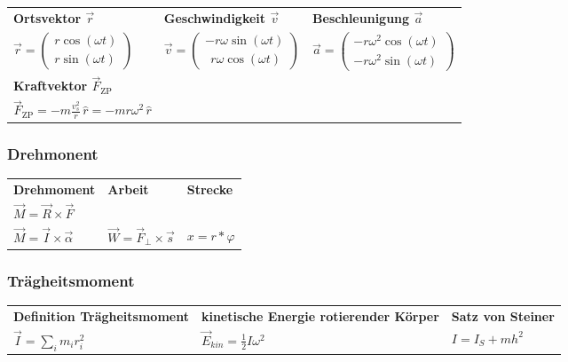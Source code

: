\documentclass[10pt,a4paper]{article}
\begin{document}
\begin{tabular}{p{} p{} p{}}
            \textbf{Ortsvektor \(\vec r\)} &
            \textbf{Geschwindigkeit \(\vec v\)}&
			\textbf{Beschleunigung \(\vec a\)} 
			\\[4pt]
			$\displaystyle
            \vec r =
            \begin{pmatrix}
                r\cos(\omega t) \\
                r\sin(\omega t)
            \end{pmatrix}$ &
            $\displaystyle
            \vec v =
            \begin{pmatrix}
                -r\omega\sin(\omega t) \\
                \;\,r\omega\cos(\omega t)
            \end{pmatrix}$ &
			$\displaystyle
			\vec a =
			\begin{pmatrix}
				-r\omega^2\cos(\omega t) \\
				-r\omega^2\sin(\omega t)
			\end{pmatrix}$
			\\[10pt]
            
            \textbf{Kraftvektor \(\vec F_{\text{ZP}}\)}
            \\[4pt]
			
            $\displaystyle
            \vec F_{\text{ZP}} = -m\frac{v_s^2}{r}\,\hat r = -m r\omega^2\,\hat r$
            \\[10pt]
		\end{tabular}
		
		\subsubsection{Drehmonent}
		\begin{tabular}{p{} p{} p{}}
			
		\textbf{Drehmoment} &
		\textbf{Arbeit} &
		\textbf{Strecke}
		\\[4pt]
		
		$\vec M = \vec R \times \vec F$ \\
		$\vec M = \vec I \times \vec \alpha$ &
		$\vec W = \vec F_{\perp} \times \vec s$ &
		$x = r*\varphi$
		\\[10pt]
		\end{tabular}
		
		\subsubsection{Trägheitsmoment}
		\begin{tabular}{p{} p{} p{}}
			
			\textbf{Definition Trägheitsmoment} &
			\textbf{kinetische Energie rotierender Körper} &
			\textbf{Satz von Steiner}
			\\[4pt]
			
			$\vec I = \displaystyle\sum_{i} m_i  r_i^2$ &
			$\vec E_{kin} = \frac{1}{2}I\omega^2$ &
			$I = I_S + mh^2$
			\\[10pt]
		\end{tabular}
		
\end{document}

